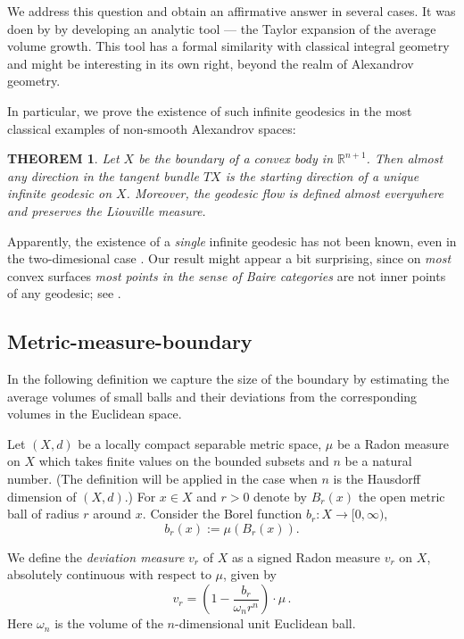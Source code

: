 \documentclass[12pt,leqno,intlimits]{amsart}
\numberwithin{equation}{section}
\newtheorem{thm}{THEOREM}[section]
\theoremstyle{definition}
\theoremstyle{remark}
\def\:{\colon}
\begin{document}
We address this question and obtain an affirmative answer in several cases.
It was doen by by developing an analytic tool --- the Taylor expansion of the average volume growth.
This tool has a formal similarity with classical integral geometry
and might be interesting in its own right, beyond the realm of Alexandrov geometry.

In particular, we prove the existence of such infinite geodesics in the most classical examples of non-smooth Alexandrov spaces:

\begin{thm} \label{thmfirst}
Let $X$ be the boundary of a convex body in $\mathbb R^{n+1}$.
Then almost any direction in the tangent bundle $TX$
is the starting direction of a unique infinite geodesic on $X$.
Moreover, the geodesic flow is defined almost everywhere and preserves the Liouville measure.
\end{thm}

Apparently, the existence of a \emph{single} infinite geodesic has not been known, even in the two-dimesional case \cite{Zam-quest}.
Our result might appear a bit surprising,
since on \emph{most} convex surfaces \emph{most points in the sense of Baire categories} are not inner points of any geodesic;
see \cite{Zam-inv}.

\subsection{Metric-measure-boundary}
In the following definition we capture the size of the boundary by estimating the average volumes of small balls and their deviations from the corresponding volumes in the Euclidean space.

Let $(X,d)$ be a locally compact separable metric space,
$\mu$ be a Radon measure on $X$ which takes finite values on the bounded subsets
and $n$ be a natural number.%
(The definition will be applied in the case when $n$ is the Hausdorff dimension of $(X,d)$.)
For $x\in X$ and $r>0$
denote by $B_r (x)$ the open metric ball of radius $r$ around $x$. Consider the Borel function $b_r\:X\to [0,\infty )$,
\begin{equation}
b_r(x):=\mu (B_r (x)).
\end{equation}

We define the \emph{deviation measure} $v_r$ of $X$ as a signed Radon measure $v_r$ on $X$, absolutely continuous with respect to $\mu$, given by
\begin{equation} \label{eq:first}
v_r = (1 - \frac {b_r} { \omega _n r^n} )\cdot \mu \, .
\end{equation}
Here $\omega _n$ is the volume of the $n$-dimensional unit Euclidean ball.
\end{document}

